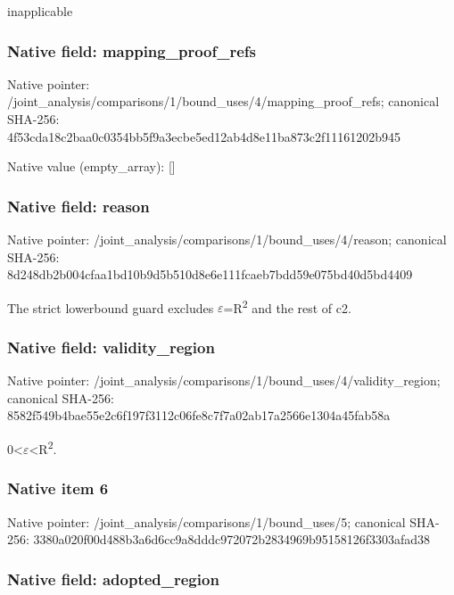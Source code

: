 \documentclass[10pt,a4paper]{article}
\begin{document}
inapplicable


\subsubsection{Native field: mapping\_proof\_refs}


Native pointer: /joint\_analysis/comparis\allowbreak{}ons/1/bound\_uses/4/mappi\allowbreak{}ng\_proof\_refs; canonical SHA-256: 4f53cda18c2baa0c0354bb5f\allowbreak{}9a3ecbe5ed12ab4d8e11ba87\allowbreak{}3c2f11161202b945



Native value (empty\_array): []



\subsubsection{Native field: reason}


Native pointer: /joint\_analysis/comparis\allowbreak{}ons/1/bound\_uses/4/reaso\allowbreak{}n; canonical SHA-256: 8d248db2b004cfaa1bd10b9d\allowbreak{}5b510d8e6e111fcaeb7bdd59\allowbreak{}e075bd40d5bd4409


The strict lowerbound guard excludes \ensuremath{\varepsilon}=R\textsuperscript{2} and the rest of c2.


\subsubsection{Native field: validity\_region}


Native pointer: /joint\_analysis/comparis\allowbreak{}ons/1/bound\_uses/4/valid\allowbreak{}ity\_region; canonical SHA-256: 8582f549b4bae55e2c6f197f\allowbreak{}3112c06fe8c7f7a02ab17a25\allowbreak{}66e1304a45fab58a


0<\ensuremath{\varepsilon}<R\textsuperscript{2}.


\subsubsection{Native item 6}


Native pointer: /joint\_analysis/comparis\allowbreak{}ons/1/bound\_uses/5; canonical SHA-256: 3380a020f00d488b3a6d6cc9\allowbreak{}a8dddc972072b2834969b951\allowbreak{}58126f3303afad38



\subsubsection{Native field: adopted\_region}
\end{document}

